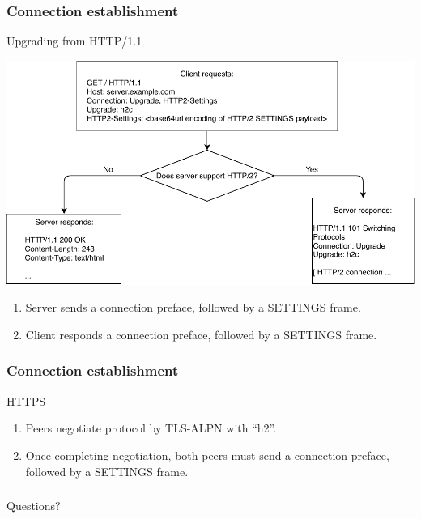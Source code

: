 \documentclass[lualatex]{beamer}
\begin{document}
\begin{frame}
  \frametitle{Connection establishment}
  \begin{block}{Upgrading from HTTP/1.1}
    \begin{center}
      \includegraphics[width=.8\textwidth]{upgrading.pdf}
    \end{center}
    \begin{enumerate}
    \item Server sends a connection preface, followed by a SETTINGS frame.
    \item Client responds a connection preface, followed by a SETTINGS frame.
    \end{enumerate}
  \end{block}
\end{frame}

\begin{frame}
  \frametitle{Connection establishment}
  \begin{block}{HTTPS}
    \begin{enumerate}
    \item Peers negotiate protocol by TLS-ALPN with ``h2''.
    \item Once completing negotiation, both peers must send a connection preface, followed by a SETTINGS frame.
    \end{enumerate}
  \end{block}
\end{frame}

\begin{frame}
  \frametitle{}
  \begin{center}
    \Huge
    Questions?
  \end{center}
\end{frame}
\end{document}
